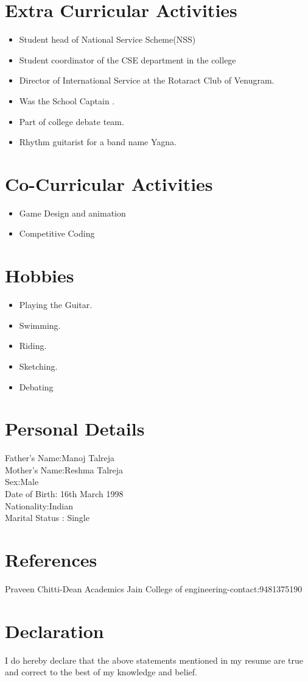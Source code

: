 \documentclass{article}
\begin{document}
		\section{Extra Curricular Activities}
			\begin{itemize}
				\item Student head of National Service Scheme(NSS)
				\item Student coordinator of the CSE department in the college
				\item Director of International Service at the Rotaract Club of Venugram.
				\item Was the School Captain .
				\item Part of college debate team.
				\item Rhythm guitarist for a band name Yagna.
			\end{itemize}
		\section{Co-Curricular Activities}
			\begin{itemize}
				\item Game Design and animation
				\item Competitive Coding 
			\end{itemize}
		\section{Hobbies}
			\begin{itemize}
				\item Playing the Guitar.
				\item Swimming.
				\item Riding.
				\item Sketching.
				\item Debating
			\end{itemize}
			\section{Personal Details}
				Father's Name:Manoj Talreja \\
				Mother's Name:Reshma Talreja\\
				Sex:Male\\
				Date of Birth: 16th March 1998\\ 	
				Nationality:Indian \\
				Marital Status : Single \\
			\section{References}
			Praveen Chitti-Dean Academics Jain College of engineering-contact:9481375190
			\section{Declaration}
				I do hereby declare that the above statements mentioned in my resume are true and correct to the best of my knowledge and belief.
		
\end{document}
